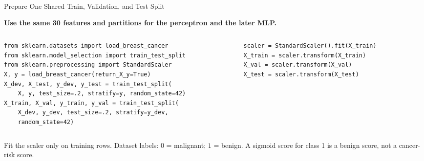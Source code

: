\documentclass[aspectratio=169,10pt]{beamer}
\newcommand{\conceptlead}[1]{{\small\bfseries\color{CalPolyGreen}#1\par}}
\begin{document}
\begin{frame}[fragile,t]{Prepare One Shared Train, Validation, and Test Split}
\small
\conceptlead{Use the same 30 features and partitions for the perceptron and the later MLP.}
\begin{columns}[T,onlytextwidth]
\begin{column}{.56\textwidth}
\scriptsize
\begin{verbatim}
from sklearn.datasets import load_breast_cancer
from sklearn.model_selection import train_test_split
from sklearn.preprocessing import StandardScaler
X, y = load_breast_cancer(return_X_y=True)
X_dev, X_test, y_dev, y_test = train_test_split(
    X, y, test_size=.2, stratify=y, random_state=42)
X_train, X_val, y_train, y_val = train_test_split(
    X_dev, y_dev, test_size=.2, stratify=y_dev,
    random_state=42)
\end{verbatim}
\end{column}
\begin{column}{.41\textwidth}
\scriptsize
\begin{verbatim}
scaler = StandardScaler().fit(X_train)
X_train = scaler.transform(X_train)
X_val = scaler.transform(X_val)
X_test = scaler.transform(X_test)
\end{verbatim}
\end{column}
\end{columns}
\begin{keyidea}Fit the scaler only on training rows. Dataset labels: $0$ = malignant; $1$ = benign. A sigmoid score for class 1 is a benign score, not a cancer-risk score.\end{keyidea}
\end{frame}
\end{document}
